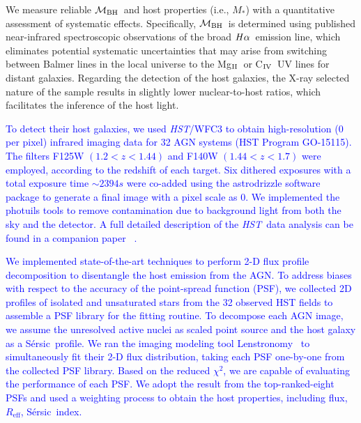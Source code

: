 \documentclass[twocolumn,trackchanges]{aastex63}
\newcommand{\hst}{{\it HST}}
\newcommand{\mbh}{$\mathcal M_{\rm BH}$}
\newcommand{\mr}{$Mag_{\rm ~R}$}
\newcommand{\halpha}{${\it H}\alpha$}
\newcommand{\sersic}{S\'ersic}
\newcommand{\lenstronomy}{{\sc Lenstronomy}}
\newcommand{\reff}{{$R_{\mathrm{eff}}$}}
\newcommand{\mstar}{{$M_*$}}
\newcommand{\Mgii}{Mg$_{\rm II}$}
\newcommand{\Civ}{C$_{\rm IV}$}
\newcommand{\blue}[1]{{ \textcolor{blue}{#1}}}
\begin{document}
We measure reliable \mbh\ and host properties (i.e., \mstar) with a quantitative assessment of systematic effects. Specifically, \mbh\ is determined using published near-infrared spectroscopic observations of the broad \halpha\ emission line, which eliminates potential systematic uncertainties that may arise from switching between Balmer lines in the local universe to the \Mgii\ or \Civ\ UV lines for distant galaxies. Regarding the detection of the host galaxies, the X-ray selected nature of the sample results in slightly lower nuclear-to-host ratios, which facilitates the inference of the host light. 

\blue{To detect their host galaxies, we used \hst/WFC3 to obtain high-resolution (0\farcs0642 per pixel) infrared imaging data for 32 AGN systems (HST Program GO-15115). The filters F125W $(1.2<z<1.44)$ and F140W $(1.44<z<1.7)$ were employed, according to the redshift of each target. Six dithered exposures with a total exposure time $\sim2394s$ were co-added using the {\sc astrodrizzle} software package to generate a final image with a pixel scale as 0\farcs0642. We implemented the {\sc photuils} tools to remove contamination due to background light from both the sky and the detector. A full detailed description of the \hst\ data analysis can be found in a companion paper ~\citep[][D19 hereafter]{Ding2019}.}

\blue{We implemented state-of-the-art techniques to perform 2-D flux profile decomposition to disentangle the host emission from the AGN. To address biases with respect to the accuracy of the point-spread function (PSF), we collected 2D profiles of isolated and unsaturated stars from the 32 observed HST fields to assemble a PSF library for the fitting routine. To decompose each AGN image, we assume the unresolved active nuclei as scaled point source and the host galaxy as a \sersic\ profile. We ran the imaging modeling tool \lenstronomy~\citep{lenstronomy} to simultaneously fit their 2-D flux distribution, taking each PSF one-by-one from the collected PSF library. Based on the reduced $\chi^2$, we are capable of evaluating the performance of each PSF. We adopt the result from the top-ranked-eight PSFs and used a weighting process to obtain the host properties, including flux, \reff, \sersic\ index.}
\end{document}
